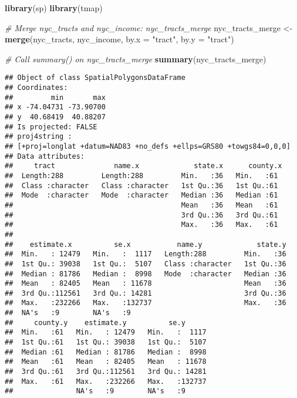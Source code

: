 \documentclass[]{article}
\newenvironment{Shaded}{\begin{snugshade}}{\end{snugshade}}
\newcommand{\CommentTok}[1]{\textcolor[rgb]{0.56,0.35,0.01}{\textit{#1}}}
\newcommand{\DataTypeTok}[1]{\textcolor[rgb]{0.13,0.29,0.53}{#1}}
\newcommand{\KeywordTok}[1]{\textcolor[rgb]{0.13,0.29,0.53}{\textbf{#1}}}
\newcommand{\NormalTok}[1]{#1}
\newcommand{\StringTok}[1]{\textcolor[rgb]{0.31,0.60,0.02}{#1}}
\begin{document}
\begin{Shaded}
\begin{Highlighting}[]
\KeywordTok{library}\NormalTok{(sp)}
\KeywordTok{library}\NormalTok{(tmap)}

\CommentTok{# Merge nyc_tracts and nyc_income: nyc_tracts_merge}
\NormalTok{nyc_tracts_merge <-}\StringTok{ }\KeywordTok{merge}\NormalTok{(nyc_tracts, nyc_income, }\DataTypeTok{by.x =} \StringTok{"tract"}\NormalTok{, }\DataTypeTok{by.y =} \StringTok{"tract"}\NormalTok{)}

\CommentTok{# Call summary() on nyc_tracts_merge}
\KeywordTok{summary}\NormalTok{(nyc_tracts_merge)}
\end{Highlighting}
\end{Shaded}

\begin{verbatim}
## Object of class SpatialPolygonsDataFrame
## Coordinates:
##         min       max
## x -74.04731 -73.90700
## y  40.68419  40.88207
## Is projected: FALSE 
## proj4string :
## [+proj=longlat +datum=NAD83 +no_defs +ellps=GRS80 +towgs84=0,0,0]
## Data attributes:
##     tract              name.x             state.x      county.x 
##  Length:288         Length:288         Min.   :36   Min.   :61  
##  Class :character   Class :character   1st Qu.:36   1st Qu.:61  
##  Mode  :character   Mode  :character   Median :36   Median :61  
##                                        Mean   :36   Mean   :61  
##                                        3rd Qu.:36   3rd Qu.:61  
##                                        Max.   :36   Max.   :61  
##                                                                 
##    estimate.x          se.x           name.y             state.y  
##  Min.   : 12479   Min.   :  1117   Length:288         Min.   :36  
##  1st Qu.: 39038   1st Qu.:  5107   Class :character   1st Qu.:36  
##  Median : 81786   Median :  8998   Mode  :character   Median :36  
##  Mean   : 82405   Mean   : 11678                      Mean   :36  
##  3rd Qu.:112561   3rd Qu.: 14281                      3rd Qu.:36  
##  Max.   :232266   Max.   :132737                      Max.   :36  
##  NA's   :9        NA's   :9                                       
##     county.y    estimate.y          se.y       
##  Min.   :61   Min.   : 12479   Min.   :  1117  
##  1st Qu.:61   1st Qu.: 39038   1st Qu.:  5107  
##  Median :61   Median : 81786   Median :  8998  
##  Mean   :61   Mean   : 82405   Mean   : 11678  
##  3rd Qu.:61   3rd Qu.:112561   3rd Qu.: 14281  
##  Max.   :61   Max.   :232266   Max.   :132737  
##               NA's   :9        NA's   :9
\end{verbatim}
\end{document}
